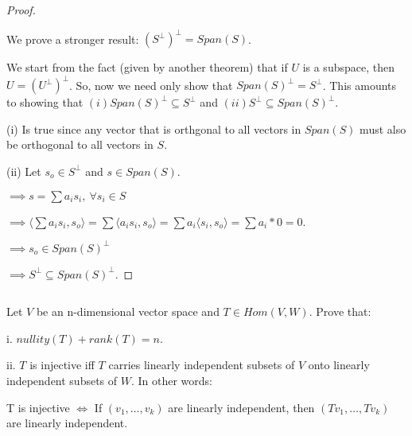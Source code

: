 \documentclass{article}
\newenvironment{customthm}[1]
  {\renewcommand\theinnercustomthm{#1}\innercustomthm}
  {\endinnercustomthm}
\begin{document}
\begin{proof}
  $ $

  We prove a stronger result:  $(S^\perp)^\perp = Span(S)$.
  \newline
  
  We start from the fact (given by another theorem) that if $U$ is a subspace, then $U = (U^\perp)^\perp$. So, now we need only show that $Span(S)^\perp = S^\perp$. This amounts to showing that $(i) Span(S)^\perp \subseteq S^\perp$ and $(ii) S^\perp \subseteq Span(S)^\perp$.
  \newline

  (i) Is true since any vector that is orthgonal to all vectors in $Span(S)$ must also be orthogonal to all vectors in $S$.
  \newline

  (ii) Let $s_o \in S^\perp$ and $s \in Span(S)$.

  \noindent
  $\implies s = \sum a_i s_i, \ \forall s_i \in S$

  \noindent
  $\implies \langle \sum a_i s_i, s_o \rangle = \sum \langle a_i s_i, s_o \rangle = \sum a_i \langle s_i, s_o \rangle = \sum a_i * 0 = 0$.

  \noindent
  $\implies s_o \in Span(S)^\perp$

  \noindent
  $\implies S^\perp \subseteq Span(S)^\perp$.

\end{proof}
\newpage

\begin{customthm}{6}[2023.S(1.B), 2022.S(1.A.ii)]
  $ $

  Let $V$ be an n-dimensional vector space and $T \in Hom(V, W)$. Prove that:

  i. $nullity(T) + rank(T) = n$.

  ii. $T$ is injective iff $T$ carries linearly independent subsets of $V$ onto linearly independent subsets of $W$. In other words:

  T is injective $\iff$ If $(v_1,\ldots,v_k)$ are linearly independent, then $(Tv_1,\ldots,Tv_k)$ are linearly independent.

\end{customthm}
\end{document}
